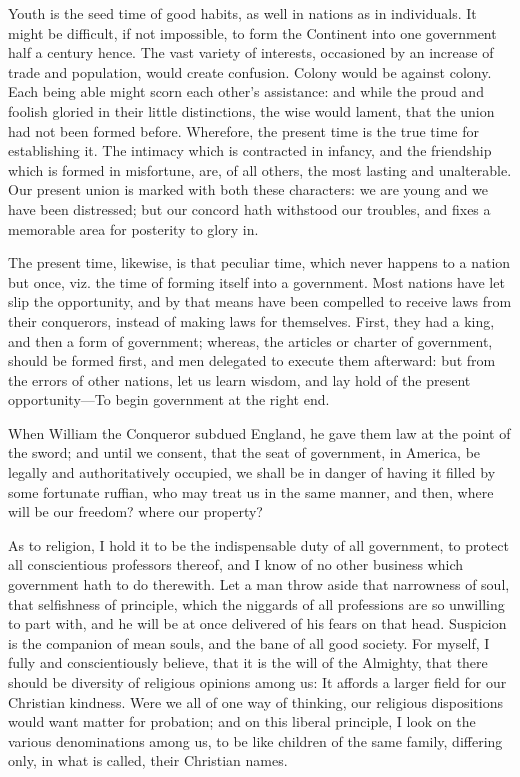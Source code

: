 \documentclass[12pt,oneside]{memoir}
\begin{document}
Youth is the seed time of good habits, as well in nations as in individuals. It might be difficult, if not impossible, to form the Continent into one government half a century hence. The vast variety of interests, occasioned by an increase of trade and population, would create confusion. Colony would be against colony. Each being able might scorn each other's assistance: and while the proud and foolish gloried in their little distinctions, the wise would lament, that the union had not been formed before. Wherefore, the present time is the true time for establishing it. The intimacy which is contracted in infancy, and the friendship which is formed in misfortune, are, of all others, the most lasting and unalterable. Our present union is marked with both these characters: we are young and we have been distressed; but our concord hath withstood our troubles, and fixes a memorable area for posterity to glory in.

The present time, likewise, is that peculiar time, which never happens to a nation but once, viz. the time of forming itself into a government. Most nations have let slip the opportunity, and by that means have been compelled to receive laws from their conquerors, instead of making laws for themselves. First, they had a king, and then a form of government; whereas, the articles or charter of government, should be formed first, and men delegated to execute them afterward: but from the errors of other nations, let us learn wisdom, and lay hold of the present opportunity---To begin government at the right end.

When William the Conqueror subdued England, he gave them law at the point of the sword; and until we consent, that the seat of government, in America, be legally and authoritatively occupied, we shall be in danger of having it filled by some fortunate ruffian, who may treat us in the same manner, and then, where will be our freedom? where our property?

As to religion, I hold it to be the indispensable duty of all government, to protect all conscientious professors thereof, and I know of no other business which government hath to do therewith. Let a man throw aside that narrowness of soul, that selfishness of principle, which the niggards of all professions are so unwilling to part with, and he will be at once delivered of his fears on that head. Suspicion is the companion of mean souls, and the bane of all good society. For myself, I fully and conscientiously believe, that it is the will of the Almighty, that there should be diversity of religious opinions among us: It affords a larger field for our Christian kindness. Were we all of one way of thinking, our religious dispositions would want matter for probation; and on this liberal principle, I look on the various denominations among us, to be like children of the same family, differing only, in what is called, their Christian names.
\end{document}
